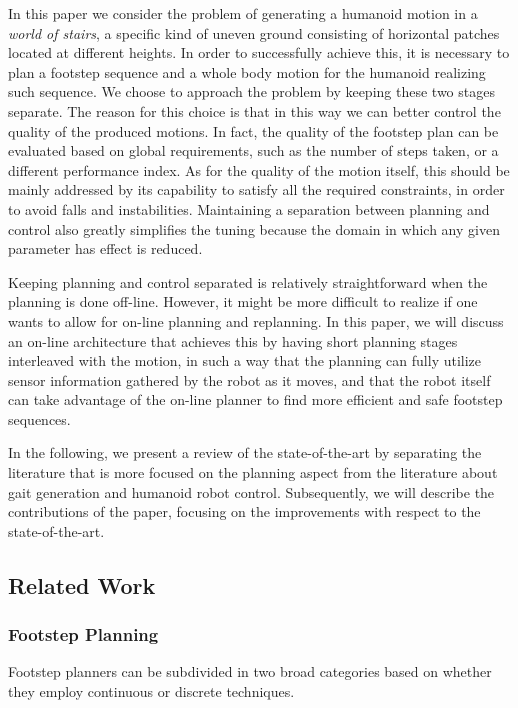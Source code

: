 In this paper we consider the problem of generating a humanoid motion in a \textit{world of stairs}, a specific kind of uneven ground consisting of horizontal patches located at different heights. In order to successfully achieve this, it is necessary to plan a footstep sequence and a whole body motion for the humanoid realizing such sequence. We choose to approach the problem by keeping these two stages separate. The reason for this choice is that in this way we can better control the quality of the produced motions. In fact, the quality of the footstep plan can be evaluated based on global requirements, such as the number of steps taken, or a different performance index. As for the quality of the motion itself, this should be mainly addressed by its capability to satisfy all the required constraints, in order to avoid falls and instabilities. Maintaining a separation between planning and control also greatly simplifies the tuning because the domain in which any given parameter has effect is reduced.

Keeping planning and control separated is relatively straightforward when the planning is done off-line. However, it might be more difficult to realize if one wants to allow for on-line planning and replanning. In this paper, we will discuss an on-line architecture that achieves this by having short planning stages interleaved with the motion, in such a way that the planning can fully utilize sensor information gathered by the robot as it moves, and that the robot itself can take advantage of the on-line planner to find more efficient and safe footstep sequences.

In the following, we present a review of the state-of-the-art by separating the literature that is more focused on the planning aspect from the literature about gait generation and humanoid robot control. Subsequently, we will describe the contributions of the paper, focusing on the improvements with respect to the state-of-the-art.

\subsection{Related Work} 
\label{subsec:RelatedWork}

\subsubsection{Footstep Planning}

Footstep planners can be subdivided in two broad categories based on whether they employ continuous or discrete techniques.


